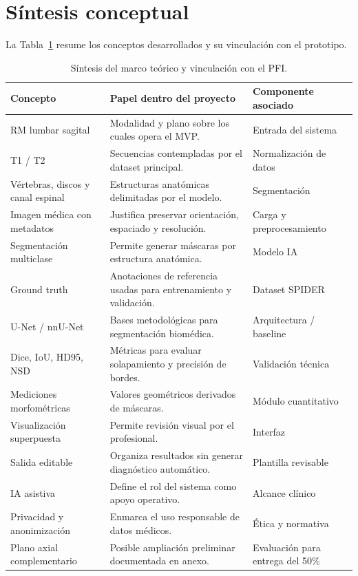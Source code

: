 \section{Síntesis conceptual}

La Tabla~\ref{tab:sintesis_marco_teorico_pfi} resume los conceptos desarrollados y su vinculación con el prototipo.

\begin{table}[htbp]
\centering
\caption{Síntesis del marco teórico y vinculación con el PFI.}
\label{tab:sintesis_marco_teorico_pfi}
\small
\begin{tabularx}{\textwidth}{p{} X p{}}
\hline
\textbf{Concepto} & \textbf{Papel dentro del proyecto} & \textbf{Componente asociado} \\
\hline
RM lumbar sagital & Modalidad y plano sobre los cuales opera el MVP. & Entrada del sistema \\
T1 / T2 & Secuencias contempladas por el dataset principal. & Normalización de datos \\
Vértebras, discos y canal espinal & Estructuras anatómicas delimitadas por el modelo. & Segmentación \\
Imagen médica con metadatos & Justifica preservar orientación, espaciado y resolución. & Carga y preprocesamiento \\
Segmentación multiclase & Permite generar máscaras por estructura anatómica. & Modelo IA \\
Ground truth & Anotaciones de referencia usadas para entrenamiento y validación. & Dataset SPIDER \\
U-Net / nnU-Net & Bases metodológicas para segmentación biomédica. & Arquitectura / baseline \\
Dice, IoU, HD95, NSD & Métricas para evaluar solapamiento y precisión de bordes. & Validación técnica \\
Mediciones morfométricas & Valores geométricos derivados de máscaras. & Módulo cuantitativo \\
Visualización superpuesta & Permite revisión visual por el profesional. & Interfaz \\
Salida editable & Organiza resultados sin generar diagnóstico automático. & Plantilla revisable \\
IA asistiva & Define el rol del sistema como apoyo operativo. & Alcance clínico \\
Privacidad y anonimización & Enmarca el uso responsable de datos médicos. & Ética y normativa \\
Plano axial complementario & Posible ampliación preliminar documentada en anexo. & Evaluación para entrega del 50\% \\
\hline
\end{tabularx}
\end{table}

